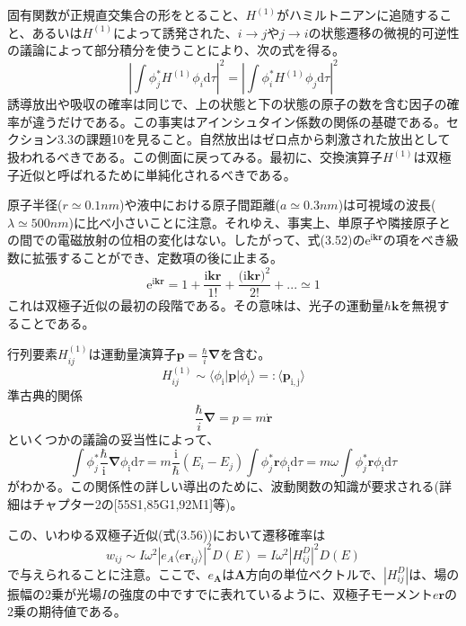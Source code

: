 \documentclass[11pt,a4j,uplatex]{jsarticle}
\begin{document}
固有関数が正規直交集合の形をとること、$H^{(1)}$がハミルトニアンに追随すること、あるいは$H^{(1)}$によって誘発された、$i\to j$や$j\to i$の状態遷移の微視的可逆性の議論によって部分積分を使うことにより、次の式を得る。
\begin{equation}
  \left|\int\phi_j^*H^{(1)}\phi_i\mathrm{d}\tau\right|^2=\left|\int\phi_i^*H^{(1)}\phi_j\mathrm{d}\tau\right|^2\tag{3.55}
\end{equation}
誘導放出や吸収の確率は同じで、上の状態と下の状態の原子の数を含む因子の確率が違うだけである。この事実はアインシュタイン係数の関係の基礎である。セクション3.3の課題10を見ること。自然放出はゼロ点から刺激された放出として扱われるべきである。この側面に戻ってみる。最初に、交換演算子$H^{(1)}$は双極子近似と呼ばれるために単純化されるべきである。

原子半径($r\simeq0.1 nm$)や液中における原子間距離($a\simeq0.3 nm$)は可視域の波長($\lambda\simeq500 nm$)に比べ小さいことに注意。それゆえ、事実上、単原子や隣接原子との間での電磁放射の位相の変化はない。したがって、式(3.52)の$\mathrm{e}^{\mathrm{i}\bm{kr}}$の項をべき級数に拡張することができ、定数項の後に止まる。
\begin{equation}
  \mathrm{e}^{\mathrm{i}\bm{kr}}=1+\frac{\mathrm{i}\bm{kr}}{1!}+\frac{{(\mathrm{i}\bm{kr}})^2}{2!}+...\simeq1\tag{3.56}
\end{equation}
これは双極子近似の最初の段階である。その意味は、光子の運動量$\hbar\bm{k}$を無視することである。

行列要素$H_{ij}^{(1)}$は運動量演算子$\bm{p}=\frac{\hbar}{i}\bm{\nabla}$を含む。
\begin{equation}
  H_{ij}^{(1)}\sim\langle\phi_{\mathrm{i}}\left|\bm{p}\right|\phi_{\mathrm{i}}\rangle=:\langle\bm{p}_{\mathrm{i,j}}\rangle
  \nonumber
\end{equation}
準古典的関係
\begin{equation}
  \frac{\hbar}{i}\bm{\nabla}=p=m\dot{\bm{r}}\tag{3.57}
\end{equation}
といくつかの議論の妥当性によって、
\begin{equation}
  \int\phi_j^*\frac{\hbar}{\mathrm{i}}\bm{\nabla}\phi_{\mathrm{i}}\mathrm{d}\tau=m\frac{\mathrm{i}}{\hbar}(E_i-E_j)\int\phi_j^*\bm{r}\phi_{\mathrm{i}}\mathrm{d}\tau=m\omega\int\phi_j^*\bm{r}\phi_{\mathrm{i}}\mathrm{d}\tau\tag{3.58}
\end{equation}
がわかる。この関係性の詳しい導出のために、波動関数の知識が要求される(詳細はチャプター2の[55S1,85G1,92M1]等)。

この、いわゆる双極子近似(式(3.56))において遷移確率は
\begin{equation}
  w_{ij}\sim I\omega^2\left|e_A\langle e\bm{r}_{ij}\rangle\right|^2D(E)=I\omega^2\left|H_{ij}^D\right|^2D(E)\tag{3.59}
\end{equation}
で与えられることに注意。ここで、$e_{\bm{A}}$は$\bm{A}$方向の単位ベクトルで、$\left|H_{ij}^D\right|$は、場の振幅の2乗が光場$I$の強度の中ですでに表れているように、双極子モーメント$e\bm{r}$の2乗の期待値である。
\end{document}
